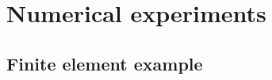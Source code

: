 \section{Numerical experiments}\label{sec:exp}
\subsection{Finite element example}\label{sec:FEexp}
\lipsum